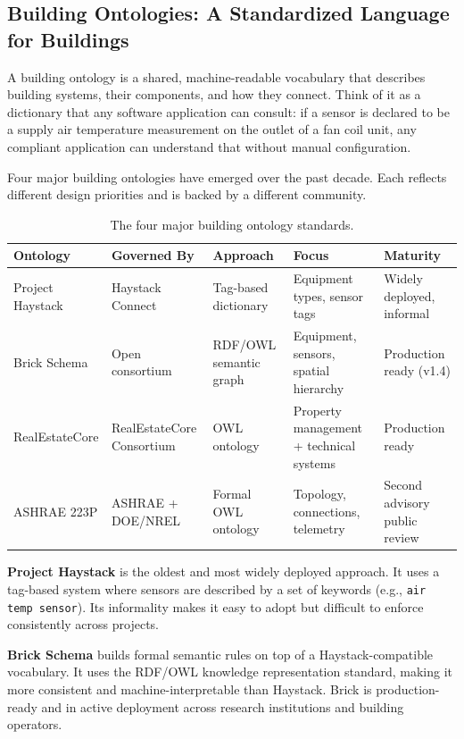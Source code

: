 \subsection{Building Ontologies: A Standardized Language for Buildings}
\label{subsec:ontologies}

A building ontology is a shared, machine-readable vocabulary that describes building systems, their
components, and how they connect.
Think of it as a dictionary that any software application can consult: if a sensor is declared to be a
supply air temperature measurement on the outlet of a fan coil unit, any compliant application
can understand that without manual configuration.

Four major building ontologies have emerged over the past decade.
Each reflects different design priorities and is backed by a different community.

\begin{table}[htbp]
\centering
\caption{The four major building ontology standards.}
\label{tab:ontologies}
\small
\begin{tabular}{lllll}
\toprule
\textbf{Ontology} & \textbf{Governed By} & \textbf{Approach} & \textbf{Focus} & \textbf{Maturity} \\
\midrule
Project Haystack & Haystack Connect & Tag-based dictionary & Equipment types, sensor tags & Widely deployed, informal \\
Brick Schema & Open consortium & RDF/OWL semantic graph & Equipment, sensors, spatial hierarchy & Production ready (v1.4) \\
RealEstateCore & RealEstateCore Consortium & OWL ontology & Property management + technical systems & Production ready \\
ASHRAE 223P & ASHRAE + DOE/NREL & Formal OWL ontology & Topology, connections, telemetry & Second advisory public review \\
\bottomrule
\end{tabular}
\end{table}

\textbf{Project Haystack} is the oldest and most widely deployed approach.
It uses a tag-based system where sensors are described by a set of keywords (e.g., \texttt{air temp sensor}).
Its informality makes it easy to adopt but difficult to enforce consistently across projects.

\textbf{Brick Schema} builds formal semantic rules on top of a Haystack-compatible vocabulary.
It uses the RDF/OWL knowledge representation standard, making it more consistent and machine-interpretable
than Haystack.
Brick is production-ready and in active deployment across research institutions and building operators.

